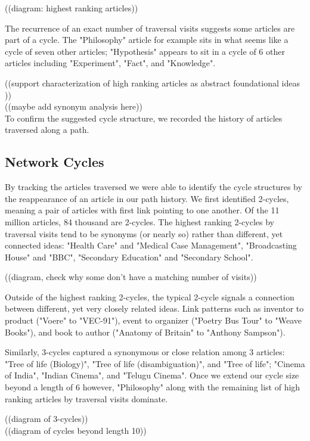 \documentclass[twoside]{article}
\begin{document}
((diagram: highest ranking articles))

The recurrence of an exact number of traversal visits suggests some articles are part of a cycle. 
The "Philosophy" article for example sits in what seems like a cycle of seven other articles; "Hypothesis" appears to sit in a 
cycle of 6 other articles including "Experiment", "Fact", and "Knowledge".



((support characterization of high ranking articles as abstract foundational ideas ))\\
((maybe add synonym analysis here))\\

To confirm the suggested cycle structure, we recorded the history of articles traversed along a path. 

\subsection{Network Cycles}
By tracking the articles traversed we were able to identify the cycle structures
by the reappearance of an article in our path history.
We first identified 2-cycles, meaning a pair of articles with first link pointing to one another.
Of the 11 million articles, 84 thousand are 2-cycles. 
The highest ranking 2-cycles by traversal visits tend to be synonyms (or nearly so) rather than different, yet connected ideas:
"Health Care" and "Medical Case Management", "Broadcasting House" and "BBC", "Secondary Education" and "Secondary School".

((diagram, check why some don't have a matching number of visits))

Outside of the highest ranking 2-cycles, the typical 2-cycle signals a connection between different, yet very closely related ideas. 
Link patterns such as inventor to product ("Voere" to "VEC-91"), event to organizer ("Poetry Bus Tour" to "Weave Books"), and book to author ("Anatomy of Britain" to "Anthony Sampson").

Similarly, 3-cycles captured a synonymous or close relation among 3 articles: "Tree of life (Biology)", "Tree of life (disambiguation)", 
and "Tree of life"; "Cinema of India", "Indian Cinema", and "Telugu Cinema". Once we extend our cycle size beyond a length of 6 however, 
"Philosophy" along with the remaining list of high ranking articles by traversal visits dominate.

((diagram of 3-cycles))\\
((diagram of cycles beyond length 10))
\end{document}
